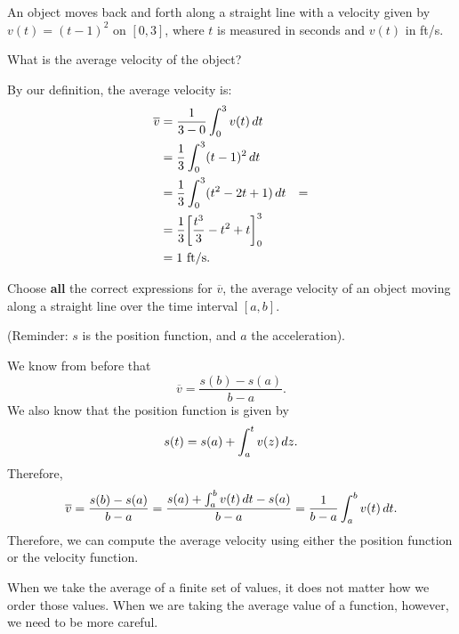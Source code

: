 \documentclass{ximera}
\begin{document}
\begin{example}
An object moves back and forth along a straight line with a velocity
given by $v(t) = (t-1)^2$ on $[0,3]$, where $t$ is measured in seconds
and $v(t)$ in ft/s.

What is the average velocity of the object?
\begin{explanation}
By our definition, the average velocity is:
\begin{align*}
\overline{v}&=\frac{1}{3-0}\int_0^3v(t)\mathop{}\!d t\\
&=\frac{1}{3}\int_0^3 (t-1)^2\mathop{}\!d t \\
&=\frac13 \int_0^3 (t^2-2t+1)\mathop{}\!d t&=\\
&= \frac13\bigg[ \frac{t^3}{3}-t^2+t \bigg]_0^3\\
&= 1\text{ ft/s}.
\end{align*}
\end{explanation}
\end{example}
\begin{question}
Choose \textbf{all} the correct expressions for $\overline{v}$, the average velocity of an object moving along a straight line over the time interval $[a,b]$.

(Reminder: $s$ is the position function, and $a$ the acceleration). 
\begin{selectAll}






\end{selectAll}
\begin{feedback}
We know from before that
\[
\overline{v}=\frac{s(b)-s(a)}{b-a}.
\]
We also know that the position function is given by
\[
s(t)=s(a)+\int_a^tv(z)\mathop{}\!d z.
\]
Therefore,
\[
\overline{v}=\frac{s(b)-s(a)}{b-a}=\frac{s(a)+\int_a^bv(t)\mathop{}\!d t-s(a)}{b-a}=\frac{1}{b-a}\int_a^bv(t)\mathop{}\!d t.
\]
Therefore, we can compute the average velocity using either the position function or the velocity function.
\end{feedback}
\end{question}


When we take the average of a finite set of values, it does not matter
how we order those values.  When we are taking the average value of a
function, however, we need to be more careful.
\end{document}
